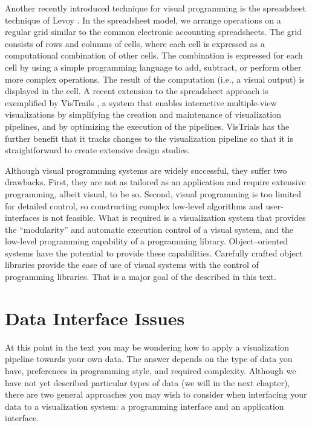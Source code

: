 Another recently introduced technique for visual programming is the spreadsheet technique of Levoy \cite{Levoy94}. In the spreadsheet model, we arrange operations on a regular grid similar to the common electronic accounting spreadsheets. The grid consists of rows and columns of cells, where each cell is expressed as a computational combination of other cells. The combination is expressed for each cell by using a simple programming language to add, subtract, or perform other more complex operations. The result of the computation (i.e., a visual output) is displayed in the cell. A recent extension to the spreadsheet approach is exemplified by VisTrails \cite{Bavoil05}, a system that enables interactive multiple-view visualizations by simplifying the creation and maintenance of visualization pipelines, and by optimizing the execution of the pipelines. VisTrials has the further benefit that it tracks changes to the visualization pipeline so that it is straightforward to create extensive design studies.

Although visual programming systems are widely successful, they suffer two drawbacks. First, they are not as tailored as an application and require extensive programming, albeit visual, to be so. Second, visual programming is too limited for detailed control, so constructing complex low-level algorithms and user-interfaces is not feasible. What is required is a visualization system that provides the ``modularity'' and automatic execution control of a visual system, and the low-level programming capability of a programming library. Object--oriented systems have the potential to provide these capabilities. Carefully crafted object libraries provide the ease of use of visual systems with the control of programming libraries. That is a major goal of the described in this text.

\section{Data Interface Issues}
\label{sec:data_interface_issues}

At this point in the text you may be wondering how to apply a visualization pipeline towards your own data. The answer depends on the type of data you have, preferences in programming style, and required complexity. Although we have not yet described particular types of data (we will in the next chapter), there are two general approaches you may wish to consider when interfacing your data to a visualization system: a programming interface and an application interface.

